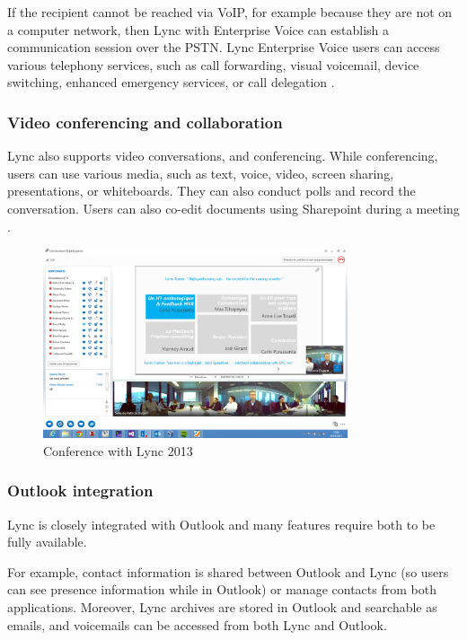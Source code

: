 If the recipient cannot be reached via VoIP, for example because they are not on a computer network, then Lync with Enterprise Voice can establish a communication session over the PSTN.
Lync Enterprise Voice users can access various telephony services, such as call forwarding, visual voicemail, device switching, enhanced emergency services, or call delegation
\cite[Ch. 1.1]{winters_mastering_2012}.

\subsubsection{Video conferencing and collaboration}
Lync also supports video conversations, and conferencing. While conferencing, users can use various media, such as text, voice, video, screen sharing, presentations, or whiteboards. They can also conduct polls and record the conversation. Users can also co-edit documents using Sharepoint during a meeting
\cite[Ch. 1.1]{winters_mastering_2012}.

\begin{figure}[h!]
	\centering
	\includegraphics[width=0.8\textwidth]{Schemas/lync.png}
	\caption{Conference with Lync 2013}
	\label{fig:lync_conferencing}
\end{figure}

\subsubsection{Outlook integration}
Lync is closely integrated with Outlook and many features require both to be fully available.

For example, contact information is shared between Outlook and Lync (so users can see presence information while in Outlook) or manage contacts from both applications. Moreover, Lync archives are stored in Outlook and searchable as emails, and voicemails can be accessed from both Lync and Outlook.

